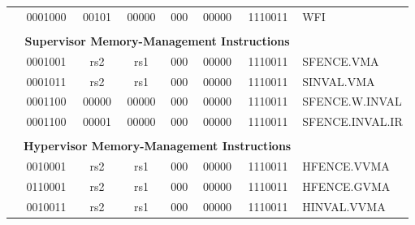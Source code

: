 \begin{table}[p]
\begin{small}
\begin{center}
\begin{tabular}{p{0in}p{0.4in}p{0.05in}p{0.05in}p{0.05in}p{0.05in}p{0.4in}p{0.6in}p{0.4in}p{0.6in}p{0.7in}l}
&
\multicolumn{4}{|c|}{0001000} &
\multicolumn{2}{c|}{00101} &
\multicolumn{1}{c|}{00000} &
\multicolumn{1}{c|}{000} &
\multicolumn{1}{c|}{00000} &
\multicolumn{1}{c|}{1110011} & WFI \\
\cline{2-11}
  

&
\multicolumn{10}{c}{} & \\
&
\multicolumn{10}{c}{\bf Supervisor Memory-Management Instructions} & \\
\cline{2-11}
  

&
\multicolumn{4}{|c|}{0001001} &
\multicolumn{2}{c|}{rs2} &
\multicolumn{1}{c|}{rs1} &
\multicolumn{1}{c|}{000} &
\multicolumn{1}{c|}{00000} &
\multicolumn{1}{c|}{1110011} & SFENCE.VMA \\
\cline{2-11}
  

&
\multicolumn{4}{|c|}{0001011} &
\multicolumn{2}{c|}{rs2} &
\multicolumn{1}{c|}{rs1} &
\multicolumn{1}{c|}{000} &
\multicolumn{1}{c|}{00000} &
\multicolumn{1}{c|}{1110011} & SINVAL.VMA \\
\cline{2-11}
  

&
\multicolumn{4}{|c|}{0001100} &
\multicolumn{2}{c|}{00000} &
\multicolumn{1}{c|}{00000} &
\multicolumn{1}{c|}{000} &
\multicolumn{1}{c|}{00000} &
\multicolumn{1}{c|}{1110011} & SFENCE.W.INVAL \\
\cline{2-11}
  

&
\multicolumn{4}{|c|}{0001100} &
\multicolumn{2}{c|}{00001} &
\multicolumn{1}{c|}{00000} &
\multicolumn{1}{c|}{000} &
\multicolumn{1}{c|}{00000} &
\multicolumn{1}{c|}{1110011} & SFENCE.INVAL.IR \\
\cline{2-11}
  

&
\multicolumn{10}{c}{} & \\
&
\multicolumn{10}{c}{\bf Hypervisor Memory-Management Instructions} & \\
\cline{2-11}
  

&
\multicolumn{4}{|c|}{0010001} &
\multicolumn{2}{c|}{rs2} &
\multicolumn{1}{c|}{rs1} &
\multicolumn{1}{c|}{000} &
\multicolumn{1}{c|}{00000} &
\multicolumn{1}{c|}{1110011} & HFENCE.VVMA \\
\cline{2-11}
  

&
\multicolumn{4}{|c|}{0110001} &
\multicolumn{2}{c|}{rs2} &
\multicolumn{1}{c|}{rs1} &
\multicolumn{1}{c|}{000} &
\multicolumn{1}{c|}{00000} &
\multicolumn{1}{c|}{1110011} & HFENCE.GVMA \\
\cline{2-11}
  

&
\multicolumn{4}{|c|}{0010011} &
\multicolumn{2}{c|}{rs2} &
\multicolumn{1}{c|}{rs1} &
\multicolumn{1}{c|}{000} &
\multicolumn{1}{c|}{00000} &
\multicolumn{1}{c|}{1110011} & HINVAL.VVMA \\
\cline{2-11}
  


\end{tabular}
\end{center}
\end{small}
\end{table}
